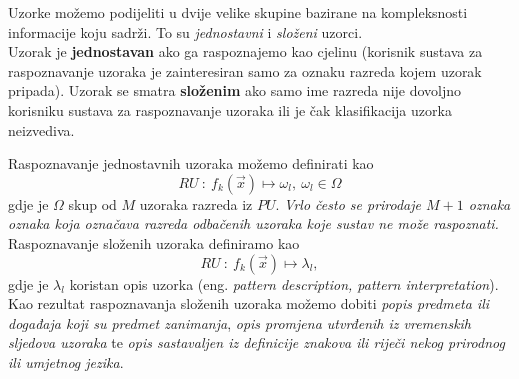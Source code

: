\documentclass{book}
\begin{document}
Uzorke možemo podijeliti u dvije velike skupine bazirane na kompleksnosti
informacije koju sadrži. To su \textit{jednostavni} i \textit{složeni} uzorci.
\\

Uzorak je \textbf{jednostavan} ako ga raspoznajemo  kao cjelinu (korisnik
sustava za raspoznavanje uzoraka je zainteresiran samo za oznaku razreda kojem
uzorak pripada). Uzorak se smatra \textbf{složenim} ako samo ime razreda nije
dovoljno korisniku sustava za raspoznavanje uzoraka ili je čak klasifikacija
uzorka neizvediva. \\



 Raspoznavanje
jednostavnih uzoraka možemo definirati kao
 $$RU \ : \ f_k( \vec{x} ) \longmapsto \omega_l, \ \omega_l \in \Omega $$  
gdje  je $\Omega$ skup od $M$ uzoraka razreda iz $PU$.  \textit{ Vrlo često se
prirodaje $M+1$ oznaka oznaka koja označava razreda  odbačenih uzoraka koje
sustav ne može raspoznati.} \\

 Raspoznavanje
složenih uzoraka definiramo kao 
$$ RU \ : \ f_k( \vec{x} ) \longmapsto \lambda_l, $$ 
gdje je $\lambda_l$ koristan  opis uzorka (eng. \textit{pattern description,
pattern interpretation}). Kao rezultat raspoznavanja složenih uzoraka možemo
dobiti \textit{popis predmeta ili događaja koji su predmet zanimanja}, \textit{
opis promjena utvrđenih iz vremenskih sljedova uzoraka} te  \textit{opis
sastavaljen iz definicije znakova ili riječi nekog prirodnog ili umjetnog
jezika}. \\
\end{document}
